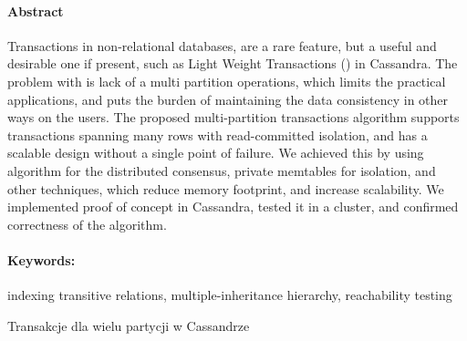 \newpage
\paragraph{Abstract} 
Transactions in non-relational databases, are a rare feature, but a useful and desirable one if present, such as Light Weight Transactions (\lwt) in Cassandra.
The problem with \lwt is lack of a multi partition operations, which limits the practical applications, and puts the burden of maintaining the data consistency in other ways on the users.
The proposed multi-partition transactions algorithm supports transactions spanning many rows with read-committed isolation, and has a scalable design without a single point of failure.
We achieved this by using \paxos algorithm for the distributed consensus, private memtables for isolation, and other techniques, which reduce memory footprint, and increase scalability.
We implemented proof of concept in Cassandra, tested it in a cluster, and confirmed correctness of the algorithm.



\paragraph{Keywords:} indexing transitive relations, multiple-inheritance hierarchy, reachability testing

\begin{center}
\vspace*{\baselineskip}
    \fontsize{15pt}{18pt}\selectfont
      Transakcje dla wielu partycji w Cassandrze  \\
\end{center}
